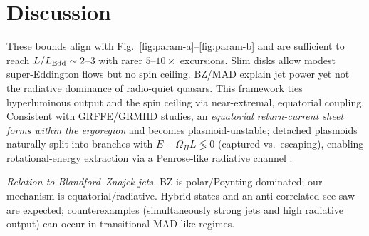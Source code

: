 \documentclass[twocolumn]{aastex701}
\newcommand{\LEdd}{L_{\rm Edd}}
\begin{document}
\clearpage
\section{Discussion}\label{sec:discussion}
These bounds align with Fig.~\ref{fig:param-a}--\ref{fig:param-b} and are sufficient to reach $L/\LEdd\sim2$--$3$ with rarer $5$--$10\times$ excursions. Slim disks allow modest super-Eddington flows but no spin ceiling. BZ/MAD explain jet power yet not the radiative dominance of radio-quiet quasars. This framework ties hyperluminous output and the spin ceiling via near-extremal, equatorial coupling.
Consistent with GRFFE/GRMHD studies, an \emph{equatorial return-current sheet forms within the ergoregion} and becomes plasmoid-unstable; detached plasmoids naturally split into branches with $E-\Omega_H L\lessgtr 0$ (captured vs.\ escaping), enabling rotational-energy extraction via a Penrose-like radiative channel \citep{Komissarov2004MNRAS,EastYang2018PRD,Pan2018PRD,Parfrey2019PRL,Bransgrove2021PRL}.


\noindent\textit{Relation to Blandford--Znajek jets.}
BZ is polar/Poynting-dominated; our mechanism is equatorial/radiative. Hybrid states and an anti-correlated see-saw are expected; counterexamples (simultaneously strong jets and high radiative output) can occur in transitional MAD-like regimes.
\end{document}
